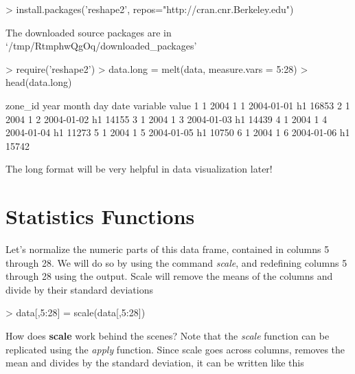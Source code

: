 \documentclass{article}
\begin{document}
\begin{Schunk}
\begin{Sinput}
> install.packages('reshape2', repos="http://cran.cnr.Berkeley.edu")
\end{Sinput}
\begin{Soutput}
The downloaded source packages are in
	‘/tmp/RtmphwQgOq/downloaded_packages’
\end{Soutput}
\begin{Sinput}
> require('reshape2')
> data.long = melt(data, measure.vars = 5:28)
> head(data.long)
\end{Sinput}
\begin{Soutput}
  zone_id year month day       date variable value
1       1 2004     1   1 2004-01-01       h1 16853
2       1 2004     1   2 2004-01-02       h1 14155
3       1 2004     1   3 2004-01-03       h1 14439
4       1 2004     1   4 2004-01-04       h1 11273
5       1 2004     1   5 2004-01-05       h1 10750
6       1 2004     1   6 2004-01-06       h1 15742
\end{Soutput}
\end{Schunk}

The long format will be very helpful in data visualization later!

\section{Statistics Functions}

Let's normalize the numeric parts of this data frame, contained in columns 5
through 28.  We will do so by using the command \textit{scale}, and redefining
columns 5 through 28 using the output.  Scale will remove the means of the
columns and divide by their standard deviations

\begin{Schunk}
\begin{Sinput}
> data[,5:28] = scale(data[,5:28])
\end{Sinput}
\end{Schunk}

How does \textbf{scale} work behind the scenes?  Note that the \textit{scale}
function can be replicated using the \textit{apply}  function.  Since scale
goes across columns, removes the mean and divides by the standard deviation,
it can be written like this
\end{document}
